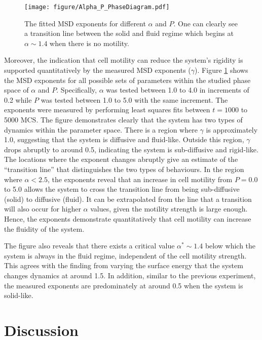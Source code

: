 \documentclass[a4paper,12pt]{article}
\begin{document}
\begin{figure}[h]
\centering
\texttt{[image: figure/Alpha\_P\_PhaseDiagram.pdf]}
\caption{The fitted MSD exponents for different $\alpha$ and $P$. One can clearly see a transition line between the solid and fluid regime which begins at $\alpha \sim 1.4$ when there is no motility.}
\label{fig:diffexpalphap}
\end{figure}
\FloatBarrier

Moreover, the indication that cell motility can reduce the system's rigidity is supported quantitatively by the measured MSD exponents ($\gamma$). Figure \ref{fig:diffexpalphap} shows the MSD exponents for all possible sets of parameters within the studied phase space of $\alpha$ and $P$. Specifically, $\alpha$ was tested between 1.0 to 4.0 in increments of 0.2 while $P$ was tested between 1.0 to 5.0 with the same increment. The exponents were measured by performing least squares fits between $t = 1000$ to 5000 MCS. The figure demonstrates clearly that the system has two types of dynamics within the parameter space. There is a region where $\gamma$ is approximately 1.0, suggesting that the system is diffusive and fluid-like. Outside this region, $\gamma$ drops abruptly to around 0.5, indicating the system is sub-diffusive and rigid-like. The locations where the exponent changes abruptly give an estimate of the ``transition line'' that distinguishes the two types of behaviours. In the region where $\alpha < 2.5$, the exponents reveal that an increase in cell motility from $P = 0.0$ to 5.0 allows the system to cross the transition line from being sub-diffusive (solid) to diffusive (fluid). It can be extrapolated from the line that a transition will also occur for higher $\alpha$ values, given the motility strength is large enough. Hence, the exponents demonstrate quantitatively that cell motility can increase the fluidity of the system. 

The figure also reveals that there exists a critical value $\alpha^* \sim 1.4$ below which the system is always in the fluid regime, independent of the cell motility strength. This agrees with the finding from varying the surface energy that the system changes dynamics at around 1.5. In addition, similar to the previous experiment, the measured exponents are predominately at around 0.5 when the system is solid-like.



\section{Discussion}
\end{document}
